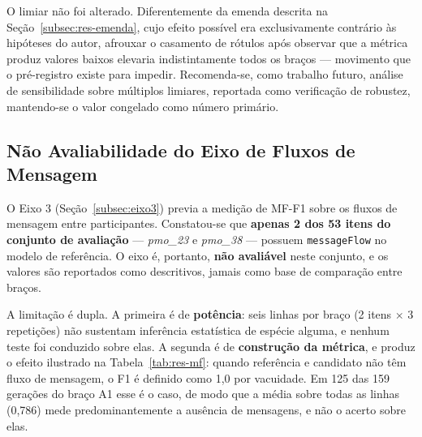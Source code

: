 O limiar não foi alterado. Diferentemente da emenda descrita na Seção~\ref{subsec:res-emenda}, cujo efeito possível era exclusivamente contrário às hipóteses do autor, afrouxar o casamento de rótulos após observar que a métrica produz valores baixos elevaria indistintamente todos os braços — movimento que o pré-registro existe para impedir. Recomenda-se, como trabalho futuro, análise de sensibilidade sobre múltiplos limiares, reportada como verificação de robustez, mantendo-se o valor congelado como número primário.

\subsection{Não Avaliabilidade do Eixo de Fluxos de Mensagem}
\label{subsec:res-mf}

O Eixo 3 (Seção~\ref{subsec:eixo3}) previa a medição de MF-F1 sobre os fluxos de mensagem entre participantes. Constatou-se que \textbf{apenas 2 dos 53 itens do conjunto de avaliação} --- \textit{pmo\_23} e \textit{pmo\_38} --- possuem \texttt{messageFlow} no modelo de referência. O eixo é, portanto, \textbf{não avaliável} neste conjunto, e os valores são reportados como descritivos, jamais como base de comparação entre braços.

A limitação é dupla. A primeira é de \textbf{potência}: seis linhas por braço (2 itens $\times$ 3 repetições) não sustentam inferência estatística de espécie alguma, e nenhum teste foi conduzido sobre elas. A segunda é de \textbf{construção da métrica}, e produz o efeito ilustrado na Tabela~\ref{tab:res-mf}: quando referência e candidato não têm fluxo de mensagem, o F1 é definido como 1,0 por vacuidade. Em 125 das 159 gerações do braço A1 esse é o caso, de modo que a média sobre todas as linhas (0,786) mede predominantemente a ausência de mensagens, e não o acerto sobre elas.

\begin{table}[h!]
\end{table}

